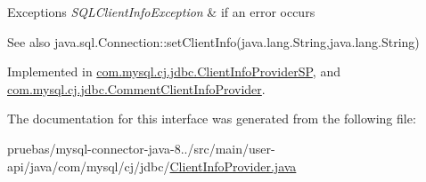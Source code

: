 \begin{DoxyExceptions}{Exceptions}
{\em S\+Q\+L\+Client\+Info\+Exception} & if an error occurs\\
\hline
\end{DoxyExceptions}
\begin{DoxySeeAlso}{See also}
java.\+sql.\+Connection\+::set\+Client\+Info(java.\+lang.\+String,java.\+lang.\+String) 
\end{DoxySeeAlso}


Implemented in \mbox{\hyperlink{classcom_1_1mysql_1_1cj_1_1jdbc_1_1_client_info_provider_s_p_a5f11c59093e5f448770a7f48fb17fcf2}{com.\+mysql.\+cj.\+jdbc.\+Client\+Info\+Provider\+SP}}, and \mbox{\hyperlink{classcom_1_1mysql_1_1cj_1_1jdbc_1_1_comment_client_info_provider_a76cfb73296a575e078acf7228e36b2dc}{com.\+mysql.\+cj.\+jdbc.\+Comment\+Client\+Info\+Provider}}.



The documentation for this interface was generated from the following file\+:\begin{DoxyCompactItemize}
\item 
pruebas/mysql-\/connector-\/java-\/8../src/main/user-\/api/java/com/mysql/cj/jdbc/\mbox{\hyperlink{_client_info_provider_8java}{Client\+Info\+Provider.\+java}}\end{DoxyCompactItemize}
